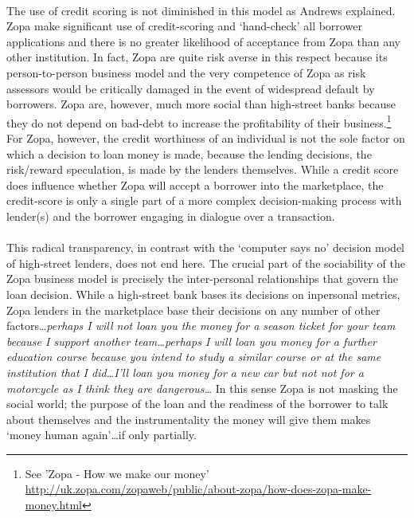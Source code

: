 \documentclass[12pt,a4paper,titlepage]{article}
\begin{document}
\paragraph{}The use of credit scoring is not diminished in this model as Andrews explained. Zopa make significant use of credit-scoring and `hand-check' all borrower applications and there is no greater likelihood of acceptance from Zopa than any other institution. In fact, Zopa are quite risk averse in this respect because its person-to-person business model and the very competence of Zopa as risk assessors would be critically damaged in the event of widespread default by borrowers. Zopa are, however, much more social than high-street banks because they do not depend on bad-debt to increase the profitability of their business.\footnote{See 'Zopa - How we make our money' \newline\url{http://uk.zopa.com/zopaweb/public/about-zopa/how-does-zopa-make-money.html}} For Zopa, however, the credit worthiness of an individual is not the sole factor on which a decision to loan money is made, because the lending decisions, the risk/reward speculation, is made by the lenders themselves. While a credit score does influence whether Zopa will accept a borrower into the marketplace, the credit-score is only a single part of a more complex decision-making process with lender(s) and the borrower engaging in dialogue over a transaction.

\paragraph{}This radical transparency, in contrast with the `computer says no' decision model of high-street lenders, does not end here. The crucial part of the sociability of the Zopa business model is precisely the inter-personal relationships that govern the loan decision. While a high-street bank bases its decisions on inpersonal metrics, Zopa lenders in the marketplace base their decisions on any number of other factors\ldots \textit{perhaps I will not loan you the money for a season ticket for your team because I support another team\ldots perhaps I will loan you money for a further education course because you intend to study a similar course or at the same institution that I did\ldots I'll loan you money for a new car but not not for a motorcycle as I think they are dangerous\ldots} In this sense Zopa is not masking the social world; the purpose of the loan and the readiness of the borrower to talk about themselves and the instrumentality the money will give them makes `money human again'\ldots if only partially.
\end{document}
